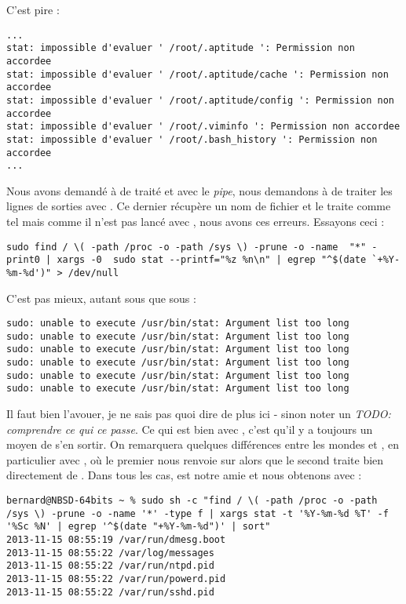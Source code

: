C'est pire :

\begin{lstlisting}[caption=problèmes de droits part I en pire certifié]
...
stat: impossible d'evaluer ' /root/.aptitude ': Permission non accordee
stat: impossible d'evaluer ' /root/.aptitude/cache ': Permission non accordee
stat: impossible d'evaluer ' /root/.aptitude/config ': Permission non accordee
stat: impossible d'evaluer ' /root/.viminfo ': Permission non accordee
stat: impossible d'evaluer ' /root/.bash_history ': Permission non accordee
...
\end{lstlisting}

Nous avons demandé à  de traité  et avec le \emph{pipe}, nous demandons à  de traiter les lignes de sorties avec . Ce dernier récupère un nom de fichier et le traite comme tel mais comme il n'est pas lancé avec , nous avons ces erreurs. Essayons ceci :

\begin{lstlisting}[caption=problèmes de droits part II]
sudo find / \( -path /proc -o -path /sys \) -prune -o -name  "*" -print0 | xargs -0  sudo stat --printf="%z %n\n" | egrep "^$(date `+%Y-%m-%d')" > /dev/null
\end{lstlisting}

C'est pas mieux, autant sous \linux{} que sous \netbsd{} :

\begin{lstlisting}[caption=problèmes de droits part II]
sudo: unable to execute /usr/bin/stat: Argument list too long
sudo: unable to execute /usr/bin/stat: Argument list too long
sudo: unable to execute /usr/bin/stat: Argument list too long
sudo: unable to execute /usr/bin/stat: Argument list too long
sudo: unable to execute /usr/bin/stat: Argument list too long
sudo: unable to execute /usr/bin/stat: Argument list too long
\end{lstlisting}

Il faut bien l'avouer, je ne sais pas quoi dire de plus ici - sinon noter un \emph{TODO: comprendre ce qui ce passe}. Ce qui est bien avec \unix{}, c'est qu'il y a toujours un moyen de s'en sortir. On remarquera quelques différences entre les mondes \linux{} et \BSD{}, en particulier avec , où le premier nous renvoie sur \bash{} alors que le second traite bien directement de \sh{}. Dans tous les cas,  est notre amie et nous obtenons avec  \netbsd{} :

\begin{lstlisting}[caption=problèmes de droits part II et fin du pire pour NetBSD]
bernard@NBSD-64bits ~ % sudo sh -c "find / \( -path /proc -o -path /sys \) -prune -o -name '*' -type f | xargs stat -t '%Y-%m-%d %T' -f '%Sc %N' | egrep '^$(date "+%Y-%m-%d")' | sort"
2013-11-15 08:55:19 /var/run/dmesg.boot
2013-11-15 08:55:22 /var/log/messages
2013-11-15 08:55:22 /var/run/ntpd.pid
2013-11-15 08:55:22 /var/run/powerd.pid
2013-11-15 08:55:22 /var/run/sshd.pid
\end{lstlisting}

